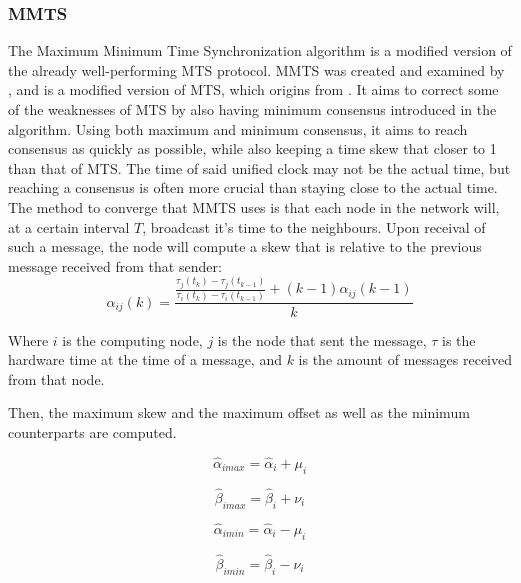 \documentclass[a4paper,12pt]{article}
\begin{document}
    \subsubsection{MMTS} The Maximum Minimum Time Synchronization algorithm is a modified version of the already well-performing MTS protocol. MMTS was created and examined by \citet{HeLiChenCheng13}, and is a modified version of MTS, which origins from \citet{HeChengShiChen11}. It aims to correct some of the weaknesses of MTS by also having minimum consensus introduced in the algorithm. Using both maximum and minimum consensus, it aims to reach consensus as quickly as possible, while also keeping a time skew that closer to 1 than that of MTS. The time of said unified clock may not be the actual time, but reaching a consensus is often more crucial than staying close to the actual time.
    The method to converge that MMTS uses is that each node in the network will, at a certain interval $T$, broadcast it's time to the neighbours. Upon receival of such a message, the node will compute a skew that is relative to the previous message received from that sender:
    \begin{equation}
        \alpha_{ij}(k) = \frac{\frac{\tau_j(t_k) - \tau_j(t_{k-1})}{\tau_i(t_k)-\tau_i(t_{k-1})} + (k-1)\alpha_{ij}(k-1)}{k}
    \end{equation}

    Where $i$ is the computing node, $j$ is the node that sent the message, $\tau$ is the hardware time at the time of a message, and $k$ is the amount of messages received from that node.
    
    Then, the maximum skew and the maximum offset as well as the minimum counterparts are computed.
    
    \begin{equation}
        \hat{\alpha}_{imax} = \hat{\alpha}_i + \mu_i
    \end{equation}
    
    \begin{equation}
        \hat{\beta}_{imax} = \hat{\beta}_i + \nu_i
    \end{equation}
    
    \begin{equation}
        \hat{\alpha}_{imin} = \hat{\alpha}_i - \mu_i
    \end{equation}
    
    \begin{equation}
        \hat{\beta}_{imin} = \hat{\beta}_i - \nu_i
    \end{equation}
    
\end{document}
